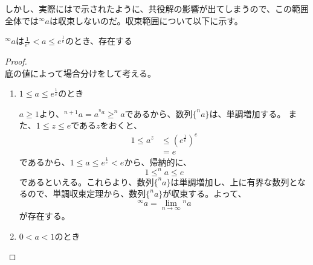 	しかし、実際にはで示されたように、共役解の影響が出てしまうので、この範囲全体では$^\infty a$は収束しないのだ。収束範囲について以下に示す。
	\begin{theorem}
	\label{th:tetration_convergence}
		$^\infty a$は$\frac{1}{e^e} < a \leq e^\frac{1}{e}$のとき、存在する
	\end{theorem}
	\begin{proof} \mbox{}\\
		底の値によって場合分けをして考える。
		\begin{enumerate}
			\item $1 \leq a \leq e^\frac{1}{e}$のとき
			
				$a \geq 1$より、$^{n+1} a = a ^{^n a} \geq ^n a$であるから、数列$\{^n a\}$は、単調増加する。
				また、$1 \leq z \leq e$である$z$をおくと、
				\begin{align*}
					1 \leq a^z &\leq (e^\frac{1}{e})^e \\
							 &= e
				\end{align*}
				であるから、$1 \leq a \leq e^\frac{1}{e} < e$から、帰納的に、
				\begin{equation*}
					1 \leq ^n a \leq e
				\end{equation*}
				であるといえる。これらより、数列$\{^n a\}$は単調増加し、上に有界な数列となるので、単調収束定理から、数列$\{^n a\}$が収束する。よって、
				\begin{equation*}
					^\infty a = \lim_{n \to \infty} {^n a}
				\end{equation*}
				が存在する。
			
			\item $0 < a < 1$のとき
		\end{enumerate}
	\end{proof}
	
	